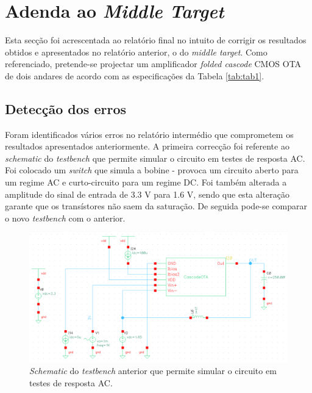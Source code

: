 \documentclass[11pt]{article}
\numberwithin{equation}{section}
\begin{document}
\section{Adenda ao \textit{Middle Target}}

Esta secção foi acrescentada ao relatório final no intuito de corrigir os resultados obtidos e apresentados no relatório anterior, o do \textit{middle target}. Como referenciado, pretende-se projectar um amplificador \textit{folded cascode} CMOS OTA de dois andares de acordo com as especificações da Tabela \ref{tab:tab1}.

\subsection{Detecção dos erros} 

Foram identificados vários erros no relatório intermédio que comprometem os resultados apresentados anteriormente. A primeira correcção foi referente ao \textit{schematic} do \textit{testbench} que permite simular o circuito em testes de resposta AC. Foi colocado um \textit{switch} que simula a bobine - provoca um circuito aberto para um regime AC e curto-circuito para um regime DC. Foi também alterada a amplitude do sinal de entrada de 3.3 V para 1.6 V, sendo que esta alteração garante que os transístores não saem da saturação. De seguida pode-se comparar o novo \textit{testbench} com o anterior.

\begin{figure}[H]
	\centering
	\includegraphics[keepaspectratio=true, scale=0.60]{exps/TBac}
	\vspace{-0.5em}
	\caption{\textit{Schematic} do \textit{testbench} anterior que permite simular o circuito em testes de resposta AC.}
	\vspace{-0.8em}
\end{figure} 
\end{document}
